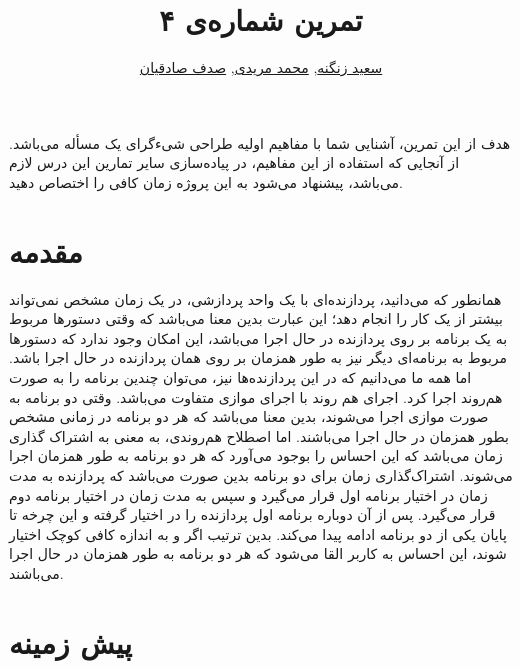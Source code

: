 \documentclass{utap}
\title{تمرین شماره‌ی ۴}
\author{ \href{mailto:zangenehsaeed412@gmail.com?subject=[AP\%20S98 A4]\%20}{سعید زنگنه},
\href{mailto:m.moridi@ut.ac.ir?subject=[AP\%20S98 A4]\%20}{محمد مریدی},
\href{mailto:sadeghian.sadaf22@gmail.com?subject=[AP\%20S98 A4]\%20}{صدف صادقیان}}
\begin{document}
	\maketitle
	
	هدف از این تمرین، آشنایی شما با مفاهیم اولیه طراحی شی‌ءگرای یک مسأله می‌باشد. از آنجایی که استفاده از این مفاهیم، در پیاده‌سازی سایر تمارین این درس لازم می‌باشد، پیشنهاد می‌شود به این پروژه زمان کافی را اختصاص دهید.
	\section{مقدمه}
	
	\hspace{5mm}
همانطور که می‌دانید، پردازنده‌ای با یک واحد پردازشی، در یک زمان مشخص نمی‌تواند بیشتر از یک کار را انجام دهد؛ این عبارت بدین معنا می‌باشد که وقتی دستورها مربوط به یک برنامه بر روی پردازنده در حال اجرا می‌باشد، این امکان وجود ندارد که دستورها مربوط به برنامه‌ای دیگر نیز به طور همزمان بر روی همان پردازنده در حال اجرا باشد. اما همه ما می‌دانیم که در این پردازنده‌ها نیز، می‌توان چندین برنامه را به صورت هم‌روند اجرا کرد. اجرای هم روند با اجرای موازی  متفاوت می‌باشد. وقتی دو برنامه به صورت موازی اجرا می‌شوند، بدین معنا می‌باشد که هر دو برنامه در زمانی مشخص بطور همزمان در حال اجرا می‌باشند. اما اصطلاح هم‌روندی، به معنی به اشتراک گذاری زمان  می‌باشد که این احساس را بوجود می‌آورد که هر دو برنامه به طور همزمان اجرا می‌شوند. اشتراک‌گذاری زمان برای دو برنامه بدین صورت می‌باشد که پردازنده به مدت زمان  در اختیار برنامه اول قرار می‌گیرد و سپس به مدت زمان   در اختیار برنامه دوم قرار می‌گیرد. پس از آن دوباره برنامه اول پردازنده را در اختیار گرفته و این چرخه تا پایان یکی از دو برنامه ادامه پیدا می‌کند. بدین ترتیب اگر   و   به اندازه کافی کوچک اختیار شوند، این احساس به کاربر القا می‌شود که هر دو برنامه به طور همزمان در حال اجرا می‌باشند.
	
	\section{پیش زمینه}
\end{document}
